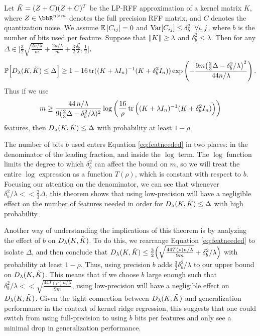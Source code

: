 \begin{theorem}
	\label{thm2}
	Let $\tilde{K} = (Z+C)(Z+C)^T$ be the LP-RFF approximation of a kernel matrix $K$, where $Z\in\RR^{n\times m}$ denotes the full precision RFF matrix, and $C$ denotes the quantization noise.  We assume $\expect{}{C_{ij}} = 0$ and ${\rm Var}[C_{ij}] \leq \delta_b^2 \;\;\forall i,j$, where $b$ is the number of bits used per feature. Suppose that $\|K\| \geq \lambda$ and $\delta^2_b \leq \lambda$. Then for any $\Delta \in \Big[\frac{3}{2}\sqrt{\frac{2n/\lambda}{m}} + \frac{2n/\lambda}{m} + \frac{3}{2}\frac{\delta^2_b}{\lambda}, \frac{1}{2} \Big]$,
	\begin{equation*}
	\mathbb{P}\Big[D_{\lambda}(K,\tilde{K}) \leq \Delta\Big] \geq 1 - 16 \mathop{\rm tr}((K + \lambda I_n)^{-1} (K + \delta^2_b I_n)) \exp \left( -\frac{9m \big(\frac{2}{3}\Delta - \delta^2_b / \lambda\big)^2}{44n/\lambda} \right).
	\end{equation*}
	Thus if we use 
	\begin{equation}
	\label{eq:featneeded}
	m \geq \frac{44\, n/\lambda}{9(\frac{2}{3}\Delta - \delta_b^2/\lambda)^{2}} \log \bigg(\frac{16}{\rho} \mathop{\rm tr}\Big((K + \lambda I_n)^{-1} (K + \delta^2_b I_n)\Big) \bigg)
	\end{equation}
	features, then $D_\lambda(K,\tilde{K})\leq \Delta$  with probability at least $1 - \rho$.
\end{theorem}

The number of bits $b$ used enters Equation \ref{eq:featneeded} in two places: in the denominator of the leading fraction, and inside the $\log$ term. The $\log$ function limits the degree to which $\delta_b^2$ can affect the bound on $m$, so we will treat the entire $\log$ expression as a function $T(\rho)$, which is constant with respect to $b$.  Focusing our attention on the denominator, we can see that whenever $\delta_b^2/\lambda << \frac{2}{3}\Delta$, this theorem shows that using low-precision will have a negligible effect on the number of features needed in order for $D_{\lambda}(K,\tilde{K}) \leq \Delta$ with high probability. 

Another way of understanding the implications of this theorem is by analyzing the effect of $b$ on $D_{\lambda}(K,\tilde{K})$. To do this, we rearrange Equation \ref{eq:featneeded} to isolate $\Delta$, and then conclude that $D_{\lambda}(K,\tilde{K}) \leq \frac{3}{2} \Big(\sqrt{\frac{44T(\rho)n/\lambda}{9m}} + \delta_b^2/\lambda\Big)$ with probability at least $1-\rho$.  Thus, using precision $b$ adds $\frac{3}{2}\delta_b^2/\lambda$ to our upper bound on $D_{\lambda}(K,\tilde{K})$.  This means that if we choose $b$ large enough such that $\delta_b^2/\lambda << \sqrt{\frac{44T(\rho)n/\lambda}{9m}}$, using low-precision will have a negligible effect on $D_{\lambda}(K,\tilde{K})$.  Given the tight connection between $D_{\lambda}(K,\tilde{K})$ and generalization performance in the context of kernel ridge regression, this suggests that one could switch from using full-precision to using $b$ bits per features and only see a minimal drop in generalization performance.

